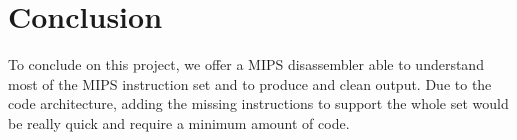 \section*{Conclusion}

To conclude on this project, we offer a MIPS disassembler able to understand most of the MIPS instruction set and to produce and clean output. Due to the code architecture, adding the missing instructions to support the whole set would be really quick and require a minimum amount of code. 